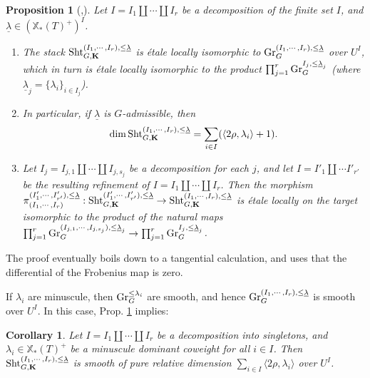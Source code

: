 \documentclass[11pt]{amsart}
\numberwithin{equation}{section}
\theoremstyle{plain}
\newtheorem{prop}[subsubsection]{Proposition}
\newtheorem{cor}[subsubsection]{Corollary}
\theoremstyle{definition}
\def\bK{\mathbf{K}}
\newcommand{\Gr}{\textup{Gr}}
\newcommand\Sht{\textup{Sht}}
\newcommand\xcoch{\mathbb{X}_*}
\renewcommand{\j}[1]{\langle{#1}\rangle}
\newcommand\un{\underline}
\renewcommand\r\rho
\renewcommand{\l}{\lambda}
\begin{document}
\begin{prop}[{\cite[Theorem 2.20]{Var}},{\cite[Theorem 2.11]{VLaff}}]\label{p:local model} Let $I=I_{1}\coprod\cdots\coprod I_{r}$ be a decomposition of the finite set $I$, and $\un\l\in (\xcoch(T)^{+})^{I}$. 

\begin{enumerate}
\item The stack $\Sht^{(I_{1},\cdots, I_{r}), \le \un\l}_{G,\bK}$ is \'etale locally isomorphic to $\Gr^{(I_{1},\cdots, I_{r}), \le\un\l}_{G}$ over $U^{I}$, which in turn is \'etale locally isomorphic to the product $\prod_{j=1}^{r}\Gr^{I_{j},\le\un\l_{j}}_{G}$ (where $\un\l_{j}=\{\l_{i}\}_{i\in I_{j}}$). 
\item In particular, if $\un\l$ is $G$-admissible, then 
\begin{equation*}
\dim \Sht^{(I_{1},\cdots, I_{r}),\le\un\l}_{G,\bK}=\sum_{i\in I}(\j{2\r, \l_{i}}+1).
\end{equation*}
\item Let $I_{j}=I_{j,1}\coprod\cdots\coprod I_{j,s_{j}}$ be a decomposition for each $j$, and let  $I=I'_{1}\coprod\cdots I'_{r'}$ be the resulting refinement of $I=I_{1}\coprod\cdots\coprod I_{r}$. Then the morphism $\pi^{(I'_{1},\cdots, I'_{r'}),\le\un\l}_{(I_{1},\cdots, I_{r})}: \Sht^{(I'_{1},\cdots, I'_{r'}), \le \un\l}_{G,\bK}\to \Sht^{(I_{1},\cdots, I_{r}), \le \un\l}_{G,\bK}$ is \'etale locally on the target isomorphic to the product of the natural maps $\prod_{j=1}^{r}\Gr^{(I_{j,1},\cdots, I_{j,s_{j}}),\le\un\l_{j}}_{G}\to \prod_{j=1}^{r}\Gr^{I_{j},\le\un\l_{j}}_{G}$.
\end{enumerate}
\end{prop} 
The proof eventually boils down to a tangential calculation, and uses that the differential of the Frobenius map is zero. 
 
If $\l_{i}$ are minuscule, then $\Gr^{\le\l_{i}}_{G}$ are smooth, and hence $\Gr^{(I_{1},\cdots, I_{r}), \le\un\l}_{G}$ is smooth over $U^{I}$. In this case, Prop. \ref{p:local model} implies:
\begin{cor}\label{c:Sht sm} Let $I=I_{1}\coprod\cdots\coprod I_{r}$ be a decomposition into  singletons, and $\l_{i}\in \xcoch(T)^{+}$ be a minuscule dominant coweight for all $i\in I$. Then $\Sht^{(I_{1},\cdots, I_{r}),\le\un\l}_{G,\bK}$ is smooth of pure relative dimension $\sum_{i\in I}\j{2\r, \l_{i}}$ over $U^{I}$.
\end{cor}
\end{document}
